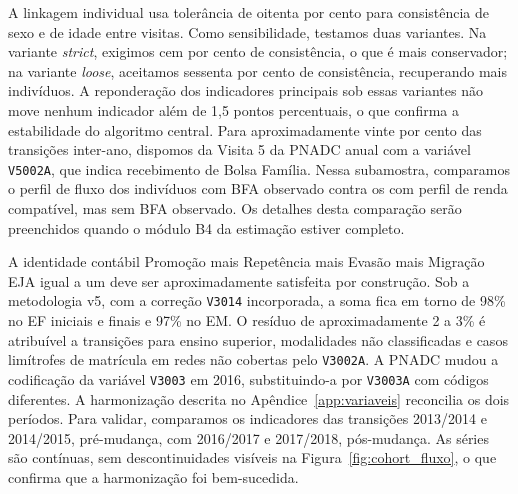 A linkagem individual usa tolerância de oitenta por cento para
consistência de sexo e de idade entre visitas. Como sensibilidade,
testamos duas variantes. Na variante \emph{strict}, exigimos cem
por cento de consistência, o que é mais conservador; na variante
\emph{loose}, aceitamos sessenta por cento de consistência,
recuperando mais indivíduos. A reponderação dos indicadores
principais sob essas variantes não move nenhum indicador além de
1,5 pontos percentuais, o que confirma a estabilidade do algoritmo
central. Para aproximadamente vinte por cento das transições
inter-ano, dispomos da Visita 5 da PNADC anual com a variável
\texttt{V5002A}, que indica recebimento de Bolsa Família. Nessa
subamostra, comparamos o perfil de fluxo dos indivíduos com BFA
observado contra os com perfil de renda compatível, mas sem BFA
observado. Os detalhes desta comparação serão preenchidos quando o
módulo B4 da estimação estiver completo.

A identidade contábil Promoção mais Repetência mais Evasão mais
Migração EJA igual a um deve ser aproximadamente satisfeita por
construção. Sob a metodologia v5, com a correção \texttt{V3014}
incorporada, a soma fica em torno de 98\% no EF iniciais e finais
e 97\% no EM. O resíduo de aproximadamente 2 a 3\% é atribuível a
transições para ensino superior, modalidades não classificadas e
casos limítrofes de matrícula em redes não cobertas pelo
\texttt{V3002A}. A PNADC mudou a codificação da
variável \texttt{V3003} em 2016, substituindo-a por \texttt{V3003A}
com códigos diferentes. A harmonização descrita no
Apêndice~\ref{app:variaveis} reconcilia os dois períodos. Para
validar, comparamos os indicadores das transições 2013/2014 e
2014/2015, pré-mudança, com 2016/2017 e 2017/2018, pós-mudança.
As séries são contínuas, sem descontinuidades visíveis na
Figura~\ref{fig:cohort_fluxo}, o que confirma que a harmonização
foi bem-sucedida.
